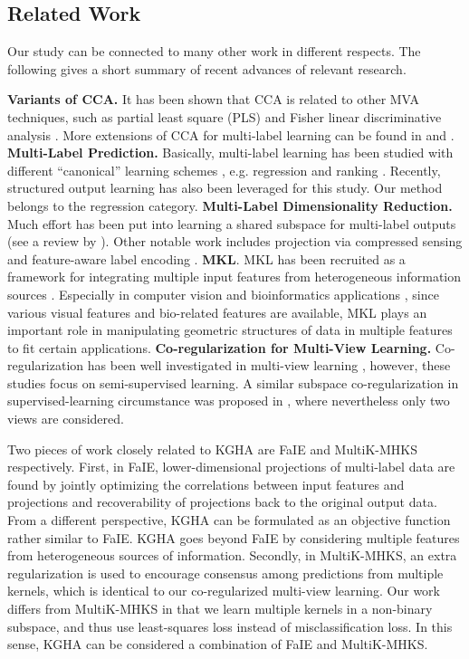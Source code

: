 \documentclass[a4paper]{article}
\newcommand{\shortcite}[1]{\cite{#1}}
\begin{document}
\subsection{Related Work}
Our study can be connected to many other work in different respects. The following gives a short summary of recent advances of relevant research. 

\textbf{Variants of CCA.} It has been shown that CCA is related to other MVA techniques, such as partial least square (PLS) \cite{Sun_2009_IJCAI}  and  Fisher linear discriminative 
analysis \cite{Sun_2011_PAMI}. More extensions of CCA for multi-label learning can be found in \citeauthor{HardoonSS04} \shortcite{HardoonSS04} and \citeauthor{Sun_2011_PAMI} \shortcite{Sun_2011_PAMI}.   
\textbf{Multi-Label Prediction.} Basically, multi-label learning has been studied with different ``canonical'' learning schemes , e.g. regression
\cite{Hsu_NIPS_2009,lin_2014_icml} and ranking \cite{RankSVM}. Recently, structured output learning has also been 
leveraged \cite{Hariharan_icml_2010,Xiong_esann_2014} for this study. Our method belongs to the regression category.  
\textbf{Multi-Label Dimensionality Reduction.} Much effort has been put into learning a shared subspace for multi-label outputs (see a review by \citeauthor{sun_MLDR} \citeyear{sun_MLDR}).
Other notable work includes projection via compressed sensing \cite{Hsu_NIPS_2009} and feature-aware label encoding  \cite{lin_2014_icml}. 
\textbf{MKL}. MKL has been recruited as a framework for integrating multiple input features from heterogeneous information 
sources \cite{MKL}. Especially in computer vision and bioinformatics applications \cite{MKL_cv, Mostafavi_2010_Bioinfo}, since various visual features and bio-related features are available, MKL plays an important role in 
manipulating geometric structures of data in multiple features to fit certain applications.  \textbf{Co-regularization for Multi-View Learning.} 
Co-regularization has been well investigated in multi-view learning \cite{Rosenberg_2007_AISTATS,Sridharan_2008_COLT}, however, these studies focus on semi-supervised learning. A similar 
subspace co-regularization in supervised-learning circumstance was proposed in \citeauthor{Guo_2012_ICML} \cite{Guo_2012_ICML}, where nevertheless only two views are considered.  

Two pieces of work closely related to KGHA are FaIE \cite{lin_2014_icml} and MultiK-MHKS \cite{MKL} respectively. 
First, in FaIE, lower-dimensional projections of multi-label data are found by jointly optimizing the correlations between input features and 
projections and recoverability of projections back to the original output data. From a different perspective, KGHA can be formulated as an objective function rather 
similar to FaIE. KGHA goes beyond FaIE by considering multiple features from heterogeneous sources of information. 
Secondly, in MultiK-MHKS, an extra regularization is used to encourage consensus among predictions from multiple kernels, which is identical to 
our co-regularized multi-view learning. Our work differs from MultiK-MHKS in that we learn multiple kernels in a non-binary subspace, and 
thus use least-squares loss instead of misclassification loss.   
In this sense, KGHA can be considered a combination of FaIE and MultiK-MHKS. 
\end{document}
